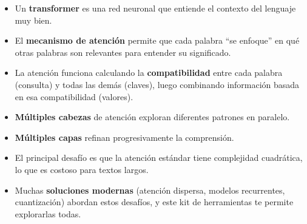 \begin{itemize}[leftmargin=*]
    \item Un \textbf{transformer} es una red neuronal que entiende el contexto del lenguaje muy bien.
    \item El \textbf{mecanismo de atención} permite que cada palabra ``se enfoque'' en qué otras palabras son relevantes para entender su significado.
    \item La atención funciona calculando la \textbf{compatibilidad} entre cada palabra (consulta) y todas las demás (claves), luego combinando información basada en esa compatibilidad (valores).
    \item \textbf{Múltiples cabezas} de atención exploran diferentes patrones en paralelo.
    \item \textbf{Múltiples capas} refinan progresivamente la comprensión.
    \item El principal desafío es que la atención estándar tiene complejidad cuadrática, lo que es costoso para textos largos.
    \item Muchas \textbf{soluciones modernas} (atención dispersa, modelos recurrentes, cuantización) abordan estos desafíos, y este kit de herramientas te permite explorarlas todas.
\end{itemize}
